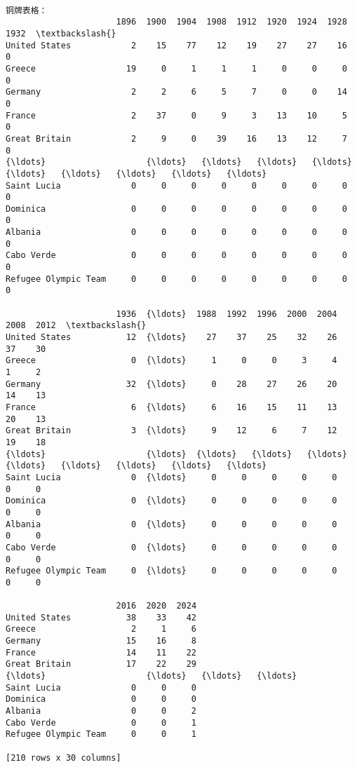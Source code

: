\documentclass[11pt]{article}
\begin{document}
    \begin{Verbatim}[commandchars=\\\{\}]

铜牌表格：
                      1896  1900  1904  1908  1912  1920  1924  1928  1932  \textbackslash{}
United States            2    15    77    12    19    27    27    16     0
Greece                  19     0     1     1     1     0     0     0     0
Germany                  2     2     6     5     7     0     0    14     0
France                   2    37     0     9     3    13    10     5     0
Great Britain            2     9     0    39    16    13    12     7     0
{\ldots}                    {\ldots}   {\ldots}   {\ldots}   {\ldots}   {\ldots}   {\ldots}   {\ldots}   {\ldots}   {\ldots}
Saint Lucia              0     0     0     0     0     0     0     0     0
Dominica                 0     0     0     0     0     0     0     0     0
Albania                  0     0     0     0     0     0     0     0     0
Cabo Verde               0     0     0     0     0     0     0     0     0
Refugee Olympic Team     0     0     0     0     0     0     0     0     0

                      1936  {\ldots}  1988  1992  1996  2000  2004  2008  2012  \textbackslash{}
United States           12  {\ldots}    27    37    25    32    26    37    30
Greece                   0  {\ldots}     1     0     0     3     4     1     2
Germany                 32  {\ldots}     0    28    27    26    20    14    13
France                   6  {\ldots}     6    16    15    11    13    20    13
Great Britain            3  {\ldots}     9    12     6     7    12    19    18
{\ldots}                    {\ldots}  {\ldots}   {\ldots}   {\ldots}   {\ldots}   {\ldots}   {\ldots}   {\ldots}   {\ldots}
Saint Lucia              0  {\ldots}     0     0     0     0     0     0     0
Dominica                 0  {\ldots}     0     0     0     0     0     0     0
Albania                  0  {\ldots}     0     0     0     0     0     0     0
Cabo Verde               0  {\ldots}     0     0     0     0     0     0     0
Refugee Olympic Team     0  {\ldots}     0     0     0     0     0     0     0

                      2016  2020  2024
United States           38    33    42
Greece                   2     1     6
Germany                 15    16     8
France                  14    11    22
Great Britain           17    22    29
{\ldots}                    {\ldots}   {\ldots}   {\ldots}
Saint Lucia              0     0     0
Dominica                 0     0     0
Albania                  0     0     2
Cabo Verde               0     0     1
Refugee Olympic Team     0     0     1

[210 rows x 30 columns]
    \end{Verbatim}
\end{document}

